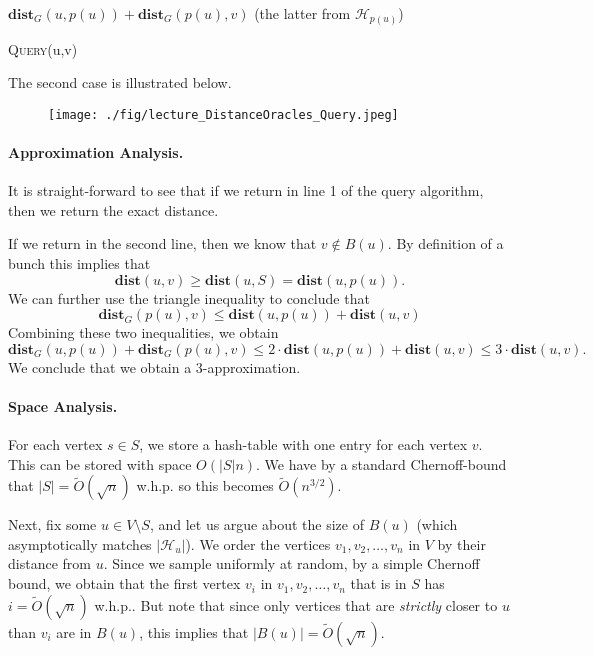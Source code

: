 \begin{algorithm}
  \SetAlgoLined
  \Return $\mathbf{dist}_G(u,p(u)) + \mathbf{dist}_G(p(u),v)$ (the latter from $\mathcal{H}_{p(u)}$)
  \caption{\textsc{Query}(u,v)}
\end{algorithm}

The second case is illustrated below.

\begin{figure}[!ht]
    \centering
    \texttt{[image: ./fig/lecture\_DistanceOracles\_Query.jpeg]}
\end{figure}

\paragraph{Approximation Analysis.} It is straight-forward to see that if we return in line 1 of the query algorithm, then we return the exact distance.

If we return in the second line, then we know that $v \not\in B(u)$. By definition of a bunch this implies that 
\[
 \mathbf{dist}(u,v) \geq \mathbf{dist}(u,S) = \mathbf{dist}(u,p(u)).
\]
We can further use the triangle inequality to conclude that
\[
\mathbf{dist}_G(p(u),v) \leq \mathbf{dist}(u,p(u)) + \mathbf{dist}(u,v)
\]
Combining these two inequalities, we obtain
\[
\mathbf{dist}_G(u,p(u)) + \mathbf{dist}_G(p(u),v) \leq 2 \cdot \mathbf{dist}(u,p(u)) + \mathbf{dist}(u,v) \leq 3 \cdot \mathbf{dist}(u,v).
\]
We conclude that we obtain a $3$-approximation.

\paragraph{Space Analysis.} For each vertex $s \in S$, we store a hash-table with one entry for each vertex $v$. This can be stored with space $O(|S|n)$. We have by a standard Chernoff-bound that $|S| = \tilde{O}(\sqrt{n})$ w.h.p. so this becomes $\tilde{O}(n^{3/2})$.

Next, fix some $u \in V \setminus S$, and let us argue about the size of $B(u)$ (which asymptotically matches $|\mathcal{H}_u|$). We order the vertices $v_1, v_2, \dots, v_n$ in $V$ by their distance from $u$. Since we sample uniformly at random, by a simple Chernoff bound, we obtain that the first vertex $v_i$ in $v_1, v_2, \dots, v_n$ that is in $S$ has $i = \tilde{O}(\sqrt{n})$ w.h.p.. But note that since only vertices that are \emph{strictly} closer to $u$ than $v_i$ are in $B(u)$, this implies that $|B(u)| = \tilde{O}(\sqrt{n})$.

